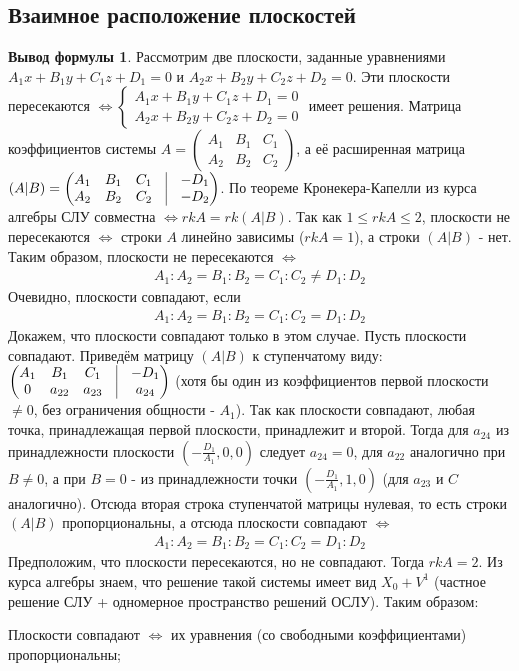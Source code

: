 \documentclass[a4paper, 12pt]{article}
\theoremstyle{definition}
\newtheorem*{formula}{Вывод формулы}
\begin{document}
	\subsection{Взаимное расположение плоскостей}
	\begin{formula}
		Рассмотрим две плоскости, заданные уравнениями $A_{1}x + B_{1}y + C_{1}z + D_{1} = 0$ и $A_{2}x + B_{2}y + C_{2}z + D_{2} = 0$. Эти плоскости пересекаются $\Leftrightarrow \begin{cases}A_{1}x + B_{1}y + C_{1}z + D_{1} = 0\\A_{2}x + B_{2}y + C_{2}z + D_{2} = 0\end{cases}$ имеет решения. Матрица коэффициентов системы $A = \begin{pmatrix} A_{1}&B_{1}&C_{1}\\A_{2}&B_{2}&C_{2}\end{pmatrix}$, а её расширенная матрица $(A|B)= \begin{pmatrix} A_{1}&B_{1}&C_{1}&\vrule&-D_{1}\\A_{2}&B_{2}&C_{2}&\vrule&-D_{2} \end{pmatrix}$.
		По теореме Кронекера-Капелли из курса алгебры СЛУ совместна $\Leftrightarrow rk A = rk (A|B)$. Так как $1 \leqslant rk A \leqslant 2$, плоскости не пересекаются $\Leftrightarrow$ строки $A$ линейно зависимы ($rk A = 1$), а строки $(A|B)$ - нет. Таким образом, плоскости не пересекаются $\Leftrightarrow$\begin{align*}A_1:A_2 = B_1:B_2 = C_1:C_2 \neq D_1:D_2 \end{align*}
		Очевидно, плоскости совпадают, если \begin{align*}A_1:A_2 = B_1:B_2 = C_1:C_2 = D_1:D_2\end{align*}
		Докажем, что плоскости совпадают только в этом случае. Пусть плоскости совпадают. Приведём матрицу $(A|B)$ к ступенчатому виду: $\begin{pmatrix} A_{1}&B_{1}&C_{1}&\vrule&-D_{1}\\0&a_{22}&a_{23}&\vrule&a_{24} \end{pmatrix}$ (хотя бы один из коэффициентов первой плоскости $\neq 0$, без ограничения общности - $A_1$). Так как плоскости совпадают, любая точка, принадлежащая первой плоскости, принадлежит и второй. Тогда для $a_{24}$ из принадлежности плоскости $(-\frac{D_1}{A_1}, 0, 0)$ следует $a_{24} = 0$, для $a_{22}$ аналогично при $B \neq 0$, а при $B = 0$ - из принадлежности точки $(-\frac{D_1}{A_1}, 1, 0)$ (для $a_{23}$ и $C$ аналогично). Отсюда вторая строка ступенчатой матрицы нулевая, то есть строки $(A|B)$ пропорциональны, а отсюда плоскости совпадают $\Leftrightarrow$ \begin{align*}A_1:A_2 = B_1:B_2 = C_1:C_2 = D_1:D_2\end{align*}
		Предположим, что плоскости пересекаются, но не совпадают. Тогда $rk A = 2$. Из курса алгебры знаем, что решение такой системы имеет вид $X_0 + V^1$ (частное решение СЛУ + одномерное пространство решений ОСЛУ).
		Таким образом:
		\begin{center}
			Плоскости совпадают $\Leftrightarrow$ их уравнения (со свободными коэффициентами) пропорциональны;


\end{center}
\end{formula}
\end{document}

